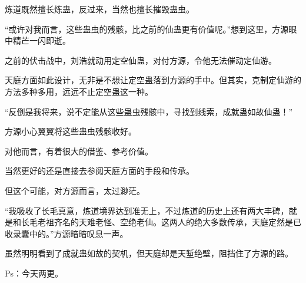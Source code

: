 \begin{this_body}
炼道既然擅长炼蛊，反过来，当然也擅长摧毁蛊虫。

“或许对我而言，这些蛊虫的残骸，比之前的仙蛊更有价值呢。”想到这里，方源眼中精芒一闪即逝。

之前的伏击战中，刘浩就动用定空仙蛊，对付方源，令他无法催动定仙游。

天庭方面如此设计，无非是不想让定空蛊落到方源的手中。但其实，克制定仙游的方法多种多用，远远不止定空蛊这一种。

“反倒是我将来，说不定能从这些蛊虫残骸中，寻找到线索，成就蛊如故仙蛊！”

方源小心翼翼将这些蛊虫残骸收好。

对他而言，有着很大的借鉴、参考价值。

当然更好的还是直接去参阅天庭方面的手段和传承。

但这个可能，对方源而言，太过渺茫。

“我吸收了长毛真意，炼道境界达到准无上，不过炼道的历史上还有两大丰碑，就是和长毛老祖齐名的天难老怪、空绝老仙。这两人的绝大多数传承，天庭定然是已收录囊中的。”方源暗暗叹息一声。

虽然明明看到了成就蛊如故的契机，但天庭却是天堑绝壁，阻挡住了方源的路。

Ps：今天两更。

\end{this_body}

